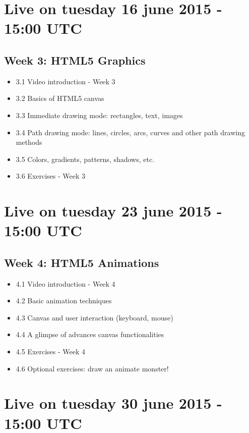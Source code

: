 \documentclass[a4paper,11pt]{book}
\begin{document}
\section{Live on tuesday 16 june 2015 - 15:00 UTC}
    \subsection{Week 3: HTML5 Graphics}
    \begin{itemize}
        \item 3.1 Video introduction - Week 3
        \item 3.2 Basics of HTML5 canvas
        \item 3.3 Immediate drawing mode: rectangles, text, images
        \item 3.4 Path drawing mode: lines, circles, arcs, curves and other path drawing methods
        \item 3.5 Colors, gradients, patterns, shadows, etc.
        \item 3.6 Exercises - Week 3
    \end{itemize}

\section{Live on tuesday 23 june 2015 - 15:00 UTC}
    \subsection{Week 4: HTML5 Animations}
    \begin{itemize}
        \item 4.1 Video introduction - Week 4
        \item 4.2 Basic animation techniques
        \item 4.3 Canvas and user interaction (keyboard, mouse)
        \item 4.4 A glimpse of advances canvas functionalities
        \item 4.5 Exercises - Week 4
        \item 4.6 Optional exercises: draw an animate monster!
    \end{itemize}

\section{Live on tuesday 30 june 2015 - 15:00 UTC}
\end{document}
